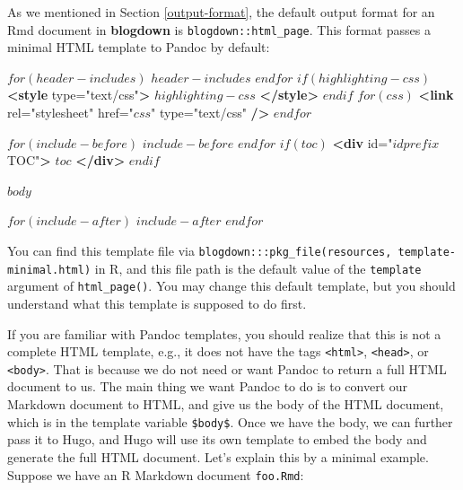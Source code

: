 \documentclass[12pt,]{krantz}
\makeatletter
\newenvironment{Shaded}{\begin{snugshade}}{\end{snugshade}}
\newcommand{\KeywordTok}[1]{\textcolor[rgb]{0.13,0.29,0.53}{\textbf{#1}}}
\newcommand{\NormalTok}[1]{#1}
\newcommand{\OtherTok}[1]{\textcolor[rgb]{0.56,0.35,0.01}{#1}}
\newcommand{\StringTok}[1]{\textcolor[rgb]{0.31,0.60,0.02}{#1}}
\newenvironment{kframe}{%
\medskip{}
\setlength{\fboxsep}{.8em}
 \def\at@end@of@kframe{}%
 \ifinner\ifhmode%
  \def\at@end@of@kframe{\end{minipage}}%
  \begin{minipage}{\columnwidth}%
 \fi\fi%
 \def\FrameCommand##1{\hskip\@totalleftmargin \hskip-\fboxsep
 \colorbox{shadecolor}{##1}\hskip-\fboxsep
     \hskip-\linewidth \hskip-\@totalleftmargin \hskip\columnwidth}%
 \MakeFramed {\advance\hsize-\width
   \@totalleftmargin\z@ \linewidth\hsize
   \@setminipage}}%
 {\par\unskip\endMakeFramed%
 \at@end@of@kframe}
\renewenvironment{Shaded}{\begin{kframe}}{\end{kframe}}
\theoremstyle{definition}
\theoremstyle{definition}
\theoremstyle{definition}
\theoremstyle{remark}
\makeatother
\begin{document}
As we mentioned in Section \ref{output-format}, the default output
format for an Rmd document in \textbf{blogdown} is
\texttt{blogdown::html\_page}. This format passes a minimal HTML
template to Pandoc by default:

\begin{Shaded}
\begin{Highlighting}[]
\NormalTok{$for(header-includes)$}
\NormalTok{$header-includes$}
\NormalTok{$endfor$}
\NormalTok{$if(highlighting-css)$}
\KeywordTok{<style}\OtherTok{ type=}\StringTok{"text/css"}\KeywordTok{>}
\NormalTok{$highlighting-css$}
\KeywordTok{</style>}
\NormalTok{$endif$}
\NormalTok{$for(css)$}
  \KeywordTok{<link}\OtherTok{ rel=}\StringTok{"stylesheet"}\OtherTok{ href=}\StringTok{"$css$"}\OtherTok{ type=}\StringTok{"text/css"} \KeywordTok{/>}
\NormalTok{$endfor$}

\NormalTok{$for(include-before)$}
\NormalTok{$include-before$}
\NormalTok{$endfor$}
\NormalTok{$if(toc)$}
\KeywordTok{<div}\OtherTok{ id=}\StringTok{"$idprefix$TOC"}\KeywordTok{>}
\NormalTok{$toc$}
\KeywordTok{</div>}
\NormalTok{$endif$}

\NormalTok{$body$}

\NormalTok{$for(include-after)$}
\NormalTok{$include-after$}
\NormalTok{$endfor$}
\end{Highlighting}
\end{Shaded}

You can find this template file via
\texttt{blogdown:::pkg\_file(\textquotesingle{}resources\textquotesingle{},\ \textquotesingle{}template-minimal.html\textquotesingle{})}
in R, and this file path is the default value of the \texttt{template}
argument of \texttt{html\_page()}. You may change this default template,
but you should understand what this template is supposed to do first.

If you are familiar with Pandoc templates, you should realize that this
is not a complete HTML template, e.g., it does not have the tags
\texttt{\textless{}html\textgreater{}},
\texttt{\textless{}head\textgreater{}}, or
\texttt{\textless{}body\textgreater{}}. That is because we do not need
or want Pandoc to return a full HTML document to us. The main thing we
want Pandoc to do is to convert our Markdown document to HTML, and give
us the body of the HTML document, which is in the template variable
\texttt{\$body\$}. Once we have the body, we can further pass it to
Hugo, and Hugo will use its own template to embed the body and generate
the full HTML document. Let's explain this by a minimal example. Suppose
we have an R Markdown document \texttt{foo.Rmd}:
\end{document}
